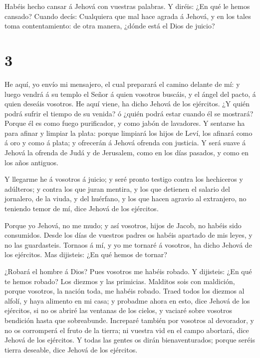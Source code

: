  Habéis hecho cansar á Jehová con vuestras palabras. Y
diréis: ¿En qué le hemos cansado? Cuando decís: Cualquiera que mal hace
agrada á Jehová, y en los tales toma contentamiento: de otra manera,
¿dónde está el Dios de juicio?

\hypertarget{section-2}{%
\section{3}\label{section-2}}

 He aquí, yo envío mi mensajero, el cual preparará el camino
delante de mí: y luego vendrá á su templo el Señor á quien vosotros
buscáis, y el ángel del pacto, á quien deseáis vosotros. He aquí viene,
ha dicho Jehová de los ejércitos.  ¿Y quién podrá sufrir el
tiempo de su venida? ó ¿quién podrá estar cuando él se mostrará? Porque
él es como fuego purificador, y como jabón de lavadores.  Y
sentarse ha para afinar y limpiar la plata: porque limpiará los hijos de
Leví, los afinará como á oro y como á plata; y ofrecerán á Jehová
ofrenda con justicia.  Y será suave á Jehová la ofrenda de
Judá y de Jerusalem, como en los días pasados, y como en los años
antiguos.

 Y llegarme he á vosotros á juicio; y seré pronto testigo
contra los hechiceros y adúlteros; y contra los que juran mentira, y los
que detienen el salario del jornalero, de la viuda, y del huérfano, y
los que hacen agravio al extranjero, no teniendo temor de mí, dice
Jehová de los ejércitos.

 Porque yo Jehová, no me mudo; y así vosotros, hijos de
Jacob, no habéis sido consumidos.  Desde los días de
vuestros padres os habéis apartado de mis leyes, y no las guardasteis.
Tornaos á mí, y yo me tornaré á vosotros, ha dicho Jehová de los
ejércitos. Mas dijisteis: ¿En qué hemos de tornar?

 ¿Robará el hombre á Dios? Pues vosotros me habéis robado. Y
dijisteis: ¿En qué te hemos robado? Los diezmos y las primicias.
 Malditos sois con maldición, porque vosotros, la nación
toda, me habéis robado.  Traed todos los diezmos al alfolí,
y haya alimento en mi casa; y probadme ahora en esto, dice Jehová de los
ejércitos, si no os abriré las ventanas de los cielos, y vaciaré sobre
vosotros bendición hasta que sobreabunde.  Increparé
también por vosotros al devorador, y no os corromperá el fruto de la
tierra; ni vuestra vid en el campo abortará, dice Jehová de los
ejércitos.  Y todas las gentes os dirán bienaventurados;
porque seréis tierra deseable, dice Jehová de los ejércitos.

